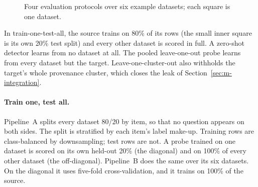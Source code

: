 \begin{figure}[t]
\centering
{}
\caption{Four evaluation protocols over six example datasets; each square is one dataset.}
\label{fig:m-protocols}
\end{figure}

In train-one-test-all, the source trains on 80\% of its rows (the small inner square is its own 20\% test split) and every other dataset is scored in full. A zero-shot detector learns from no dataset at all. The pooled leave-one-out probe learns from every dataset but the target. Leave-one-cluster-out also withholds the target's whole provenance cluster, which closes the leak of Section~\ref{sec:m-integration}.

\paragraph{Train one, test all.} Pipeline~A splits every dataset 80/20 by item, so that no question appears on both sides. The split is stratified by each item's label make-up. %
Training rows are class-balanced by downsampling; test rows are not. %
A probe trained on one dataset is scored on its own held-out 20\% (the diagonal) and on 100\% of every other dataset (the off-diagonal).
Pipeline~B does the same over its six datasets. On the diagonal it uses five-fold cross-validation, and it trains on 100\% of the source. %

